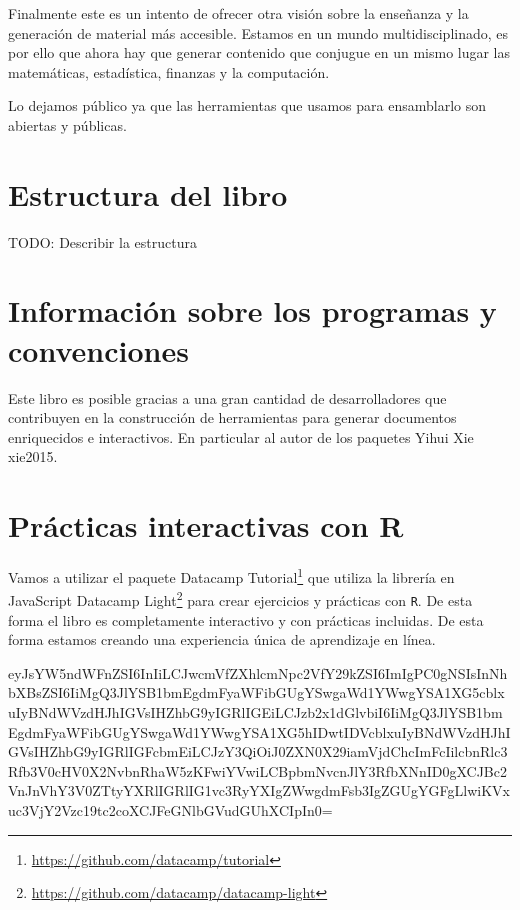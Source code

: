 \documentclass[12pt,]{krantz}
\renewcommand{\href}[2]{#2\footnote{\url{#1}}}
\theoremstyle{definition}
\theoremstyle{definition}
\theoremstyle{definition}
\theoremstyle{remark}
\begin{document}
Finalmente este es un intento de ofrecer otra visión sobre la enseñanza
y la generación de material más accesible. Estamos en un mundo
multidisciplinado, es por ello que ahora hay que generar contenido que
conjugue en un mismo lugar las matemáticas, estadística, finanzas y la
computación.

Lo dejamos público ya que las herramientas que usamos para ensamblarlo
son abiertas y públicas.

\section*{Estructura del libro}\label{estructura-del-libro}


TODO: Describir la estructura

\section*{Información sobre los programas y
convenciones}\label{informacion-sobre-los-programas-y-convenciones}

Este libro es posible gracias a una gran cantidad de desarrolladores que
contribuyen en la construcción de herramientas para generar documentos
enriquecidos e interactivos. En particular al autor de los paquetes
Yihui Xie xie2015.

\section*{Prácticas interactivas con
R}\label{practicas-interactivas-con-r}


Vamos a utilizar el paquete
\href{https://github.com/datacamp/tutorial}{Datacamp Tutorial} que
utiliza la librería en JavaScript
\href{https://github.com/datacamp/datacamp-light}{Datacamp Light} para
crear ejercicios y prácticas con \texttt{R}. De esta forma el libro es
completamente interactivo y con prácticas incluidas. De esta forma
estamos creando una experiencia única de aprendizaje en línea.

eyJsYW5ndWFnZSI6InIiLCJwcmVfZXhlcmNpc2VfY29kZSI6ImIgPC0gNSIsInNhbXBsZSI6IiMgQ3JlYSB1bmEgdmFyaWFibGUgYSwgaWd1YWwgYSA1XG5cblxuIyBNdWVzdHJhIGVsIHZhbG9yIGRlIGEiLCJzb2x1dGlvbiI6IiMgQ3JlYSB1bmEgdmFyaWFibGUgYSwgaWd1YWwgYSA1XG5hIDwtIDVcblxuIyBNdWVzdHJhIGVsIHZhbG9yIGRlIGFcbmEiLCJzY3QiOiJ0ZXN0X29iamVjdChcImFcIilcbnRlc3Rfb3V0cHV0X2NvbnRhaW5zKFwiYVwiLCBpbmNvcnJlY3RfbXNnID0gXCJBc2VnJnVhY3V0ZTtyYXRlIGRlIG1vc3RyYXIgZWwgdmFsb3IgZGUgYGFgLlwiKVxuc3VjY2Vzc19tc2coXCJFeGNlbGVudGUhXCIpIn0=
\end{document}
